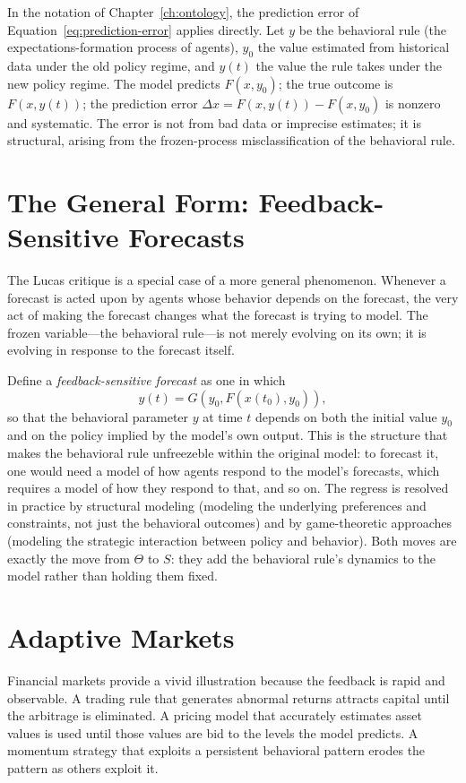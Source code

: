 \documentclass[11pt]{book}
\theoremstyle{plain}
\theoremstyle{definition}
\theoremstyle{remark}
\begin{document}
In the notation of Chapter~\ref{ch:ontology}, the prediction error of Equation~\eqref{eq:prediction-error} applies directly. Let $y$ be the behavioral rule (the expectations-formation process of agents), $y_0$ the value estimated from historical data under the old policy regime, and $y(t)$ the value the rule takes under the new policy regime. The model predicts $F(x, y_0)$; the true outcome is $F(x, y(t))$; the prediction error $\Delta x = F(x,y(t)) - F(x,y_0)$ is nonzero and systematic. The error is not from bad data or imprecise estimates; it is structural, arising from the frozen-process misclassification of the behavioral rule.

\section{The General Form: Feedback-Sensitive Forecasts}

The Lucas critique is a special case of a more general phenomenon. Whenever a forecast is acted upon by agents whose behavior depends on the forecast, the very act of making the forecast changes what the forecast is trying to model. The frozen variable---the behavioral rule---is not merely evolving on its own; it is evolving in response to the forecast itself.

Define a \emph{feedback-sensitive forecast} as one in which
\[
y(t) = G(y_0, F(x(t_0), y_0)),
\]
so that the behavioral parameter $y$ at time $t$ depends on both the initial value $y_0$ and on the policy implied by the model's own output. This is the structure that makes the behavioral rule unfreezeble within the original model: to forecast it, one would need a model of how agents respond to the model's forecasts, which requires a model of how they respond to that, and so on. The regress is resolved in practice by structural modeling (modeling the underlying preferences and constraints, not just the behavioral outcomes) and by game-theoretic approaches (modeling the strategic interaction between policy and behavior). Both moves are exactly the move from $\Theta$ to $S$: they add the behavioral rule's dynamics to the model rather than holding them fixed.

\section{Adaptive Markets}

Financial markets provide a vivid illustration because the feedback is rapid and observable. A trading rule that generates abnormal returns attracts capital until the arbitrage is eliminated. A pricing model that accurately estimates asset values is used until those values are bid to the levels the model predicts. A momentum strategy that exploits a persistent behavioral pattern erodes the pattern as others exploit it.
\end{document}
